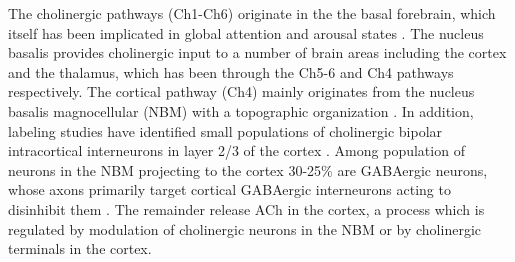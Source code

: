 The cholinergic pathways (Ch1-Ch6) originate in the the basal
forebrain, which itself has been implicated in global attention and
arousal states \citep{Jones2004}. The nucleus basalis provides
cholinergic input to a number of brain areas including the cortex and
the thalamus, which has been through the Ch5-6 and Ch4 pathways
respectively. The cortical pathway (Ch4) mainly originates from the
nucleus basalis magnocellular (NBM) with a topographic organization
\citep{Woolf1991}. In addition, labeling studies have identified small
populations of cholinergic bipolar intracortical interneurons in layer
2/3 of the cortex \citep{vonEngelhardt2007}. Among population of
neurons in the NBM projecting to the cortex 30-25\% are GABAergic
neurons, whose axons primarily target cortical GABAergic interneurons
acting to disinhibit them \citep{Lucas-Meunier2003}. The remainder
release ACh in the cortex, a process which is regulated by modulation
of cholinergic neurons in the NBM or by cholinergic terminals in the
cortex.

